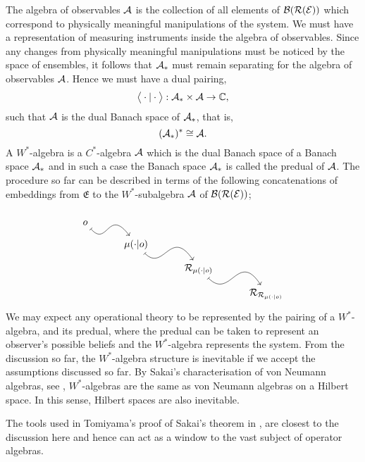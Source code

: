 \documentclass[11pt]{article}
\begin{document}
 The algebra of observables $\mathcal{A}$ is the collection of all elements of $\mathcal{B}(\mathcal{R}(\mathcal{E}))$ which correspond to physically meaningful manipulations of the system. We must have a representation of measuring instruments inside the algebra of observables. Since any changes from physically meaningful manipulations must be noticed by the space of ensembles, it follows that $\mathcal{A}_*$ must remain separating for the algebra of observables $\mathcal{A}$. Hence we must have a dual pairing,
$$\big\langle\cdot|\cdot\big\rangle:\mathcal{A}_*\times \mathcal{A}\to \mathbb{C},$$
such that $\mathcal{A}$ is the dual Banach space of $\mathcal{A}_*$, that is,
$$(\mathcal{A}_*)^*\cong \mathcal{A}.$$
A $W^*$-algebra is a $C^*$-algebra $\mathcal{A}$ which is the dual Banach space of a Banach space $\mathcal{A}_*$ and in such a case the Banach space $\mathcal{A}_*$ is called the predual of $\mathcal{A}$. The procedure so far can be described in terms of the following concatenations of embeddings from $\mathfrak{E}$ to the $W^*$-subalgebra $\mathcal{A}$ of $\mathcal{B}(\mathcal{R}(\mathcal{E}))$;
\[
\begin{tikzcd}[row sep=.75em, column sep=1cm]
	o \\
	& {\mu(\cdot|o)} \\
	&& {\Rcal_{\mu(\cdot|o)}} \\
	&&& {\Rcal_{\Rcal_{\mu(\cdot|o)}}}
	\arrow[mapsto, from=1-1, to=2-2,controls={+(.8,-.9) and +(-1,1.35)},]
	\arrow[mapsto, from=2-2, to=3-3,controls={+(1,-1) and +(-1,1.5)},]
	\arrow[mapsto, from=3-3, to=4-4,controls={+(1.15,-1.15) and +(-1,1.55)},]
\end{tikzcd}
\]
We may expect any operational theory to be represented by the pairing of a $W^*$-algebra, and its predual, where the predual can be taken to represent an observer's possible beliefs and the $W^*$-algebra represents the system. From the discussion so far, the $W^*$-algebra structure is inevitable if we accept the assumptions discussed so far. By Sakai's characterisation of von Neumann algebras, see \cite{Sakai}, $W^*$-algebras are the same as von Neumann algebras on a Hilbert space. In this sense, Hilbert spaces are also inevitable. 

The tools used in Tomiyama's proof of Sakai's theorem in \cite{TomiyamaII}, are closest to the discussion here and hence can act as a window to the vast subject of operator algebras.
\end{document}
